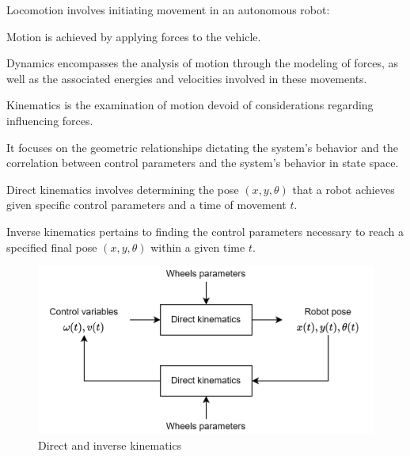 \begin{definition}
    Locomotion involves initiating movement in an autonomous robot:
\end{definition}
Motion is achieved by applying forces to the vehicle.
\begin{definition}
    Dynamics encompasses the analysis of motion through the modeling of forces, as well as the associated energies and velocities involved in these movements.
\end{definition} 
\begin{definition}
    Kinematics is the examination of motion devoid of considerations regarding influencing forces. 
\end{definition}
It focuses on the geometric relationships dictating the system's behavior and the correlation between control parameters and the system's behavior in state space.

\begin{definition}
    Direct kinematics involves determining the pose $(x, y, \theta)$ that a robot achieves given specific control parameters and a time of movement $t$.
\end{definition}
\begin{definition}
    Inverse kinematics pertains to finding the control parameters necessary to reach a specified final pose $(x, y, \theta)$ within a given time $t$.
\end{definition}
\begin{figure}[H]
    \centering
    \includegraphics[width=0.75\linewidth]{images/kin.png} 
    \caption{Direct and inverse kinematics}
\end{figure}